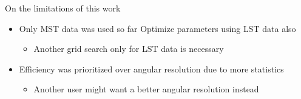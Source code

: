 \begin{frame}{On the limitations of this work}
    \begin{itemize}
        \item Only MST data was used so far \rightarrow{} Optimize parameters using LST data also
        \begin{itemize}
            \item [\rightarrow] Another grid search only for LST data is necessary
        \end{itemize}
        \setlength\itemsep{1em}
        \item Efficiency was prioritized over angular resolution due to more statistics
        \begin{itemize}
            \item [\rightarrow] Another user might want a better angular resolution instead
        \end{itemize}
    \end{itemize}
\end{frame}

